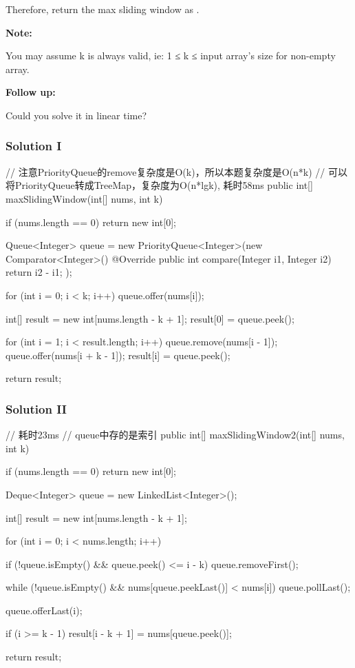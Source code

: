 Therefore, return the max sliding window as \code{[3,3,5,5,6,7]}.

\textbf{Note:}

You may assume k is always valid, ie: 1 ≤ k ≤ input array's size for non-empty array.

\textbf{Follow up:}

Could you solve it in linear time?

\subsubsection{Solution I}

\begin{Code}
// 注意PriorityQueue的remove复杂度是O(k)，所以本题复杂度是O(n*k)
// 可以将PriorityQueue转成TreeMap，复杂度为O(n*lgk), 耗时58ms
public int[] maxSlidingWindow(int[] nums, int k) {
    if (nums.length == 0) {
        return new int[0];
    }

    Queue<Integer> queue = new PriorityQueue<Integer>(new Comparator<Integer>() {
        @Override
        public int compare(Integer i1, Integer i2) {
            return i2 - i1;
        }
    });

    for (int i = 0; i < k; i++) {
        queue.offer(nums[i]);
    }

    int[] result = new int[nums.length - k + 1];
    result[0] = queue.peek();

    for (int i = 1; i < result.length; i++) {
        queue.remove(nums[i - 1]);
        queue.offer(nums[i + k - 1]);
        result[i] = queue.peek();
    }

    return result;
}
\end{Code}

\newpage

\subsubsection{Solution II}
\begin{Code}

// 耗时23ms
// queue中存的是索引
public int[] maxSlidingWindow2(int[] nums, int k) {
    if (nums.length == 0) {
        return new int[0];
    }

    Deque<Integer> queue = new LinkedList<Integer>();

    int[] result = new int[nums.length - k + 1];

    for (int i = 0; i < nums.length; i++) {
        if (!queue.isEmpty() && queue.peek() <= i - k) {
            queue.removeFirst();
        }

        while (!queue.isEmpty() && nums[queue.peekLast()] < nums[i]) {
            queue.pollLast();
        }

        queue.offerLast(i);

        if (i >= k - 1) {
            result[i - k + 1] = nums[queue.peek()];
        }
    }

    return result;
}
\end{Code}

